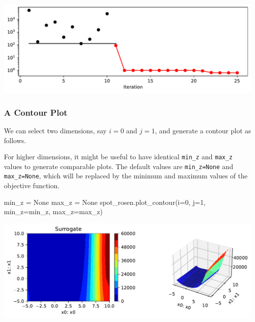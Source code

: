 \documentclass[
  letterpaper,
  DIV=11,
  numbers=noendperiod]{scrreprt}
\newenvironment{Shaded}{\begin{snugshade}}{\end{snugshade}}
\newcommand{\DecValTok}[1]{\textcolor[rgb]{0.68,0.00,0.00}{#1}}
\newcommand{\NormalTok}[1]{\textcolor[rgb]{0.00,0.23,0.31}{#1}}
\newcommand{\OperatorTok}[1]{\textcolor[rgb]{0.37,0.37,0.37}{#1}}
\newcommand{\VariableTok}[1]{\textcolor[rgb]{0.07,0.07,0.07}{#1}}
\begin{document}
\includegraphics{008_num_spot_multidim_files/figure-pdf/cell-16-output-1.pdf}

\subsubsection{A Contour Plot}\label{a-contour-plot-1}

We can select two dimensions, say \(i=0\) and \(j=1\), and generate a
contour plot as follows.

\begin{tcolorbox}[enhanced jigsaw, coltitle=black, bottomrule=.15mm, breakable, toprule=.15mm, colframe=quarto-callout-note-color-frame, title=\textcolor{quarto-callout-note-color}{\faInfo}\hspace{0.5em}{Note:}, colbacktitle=quarto-callout-note-color!10!white, opacityback=0, left=2mm, leftrule=.75mm, colback=white, rightrule=.15mm, bottomtitle=1mm, toptitle=1mm, titlerule=0mm, arc=.35mm, opacitybacktitle=0.6]

For higher dimensions, it might be useful to have identical
\texttt{min\_z} and \texttt{max\_z} values to generate comparable plots.
The default values are \texttt{min\_z=None} and \texttt{max\_z=None},
which will be replaced by the minimum and maximum values of the
objective function.

\end{tcolorbox}

\begin{Shaded}
\begin{Highlighting}[]
\NormalTok{min\_z }\OperatorTok{=} \VariableTok{None}
\NormalTok{max\_z }\OperatorTok{=} \VariableTok{None}
\NormalTok{spot\_rosen.plot\_contour(i}\OperatorTok{=}\DecValTok{0}\NormalTok{, j}\OperatorTok{=}\DecValTok{1}\NormalTok{, min\_z}\OperatorTok{=}\NormalTok{min\_z, max\_z}\OperatorTok{=}\NormalTok{max\_z)}
\end{Highlighting}
\end{Shaded}

\includegraphics{008_num_spot_multidim_files/figure-pdf/cell-17-output-1.pdf}
\end{document}
